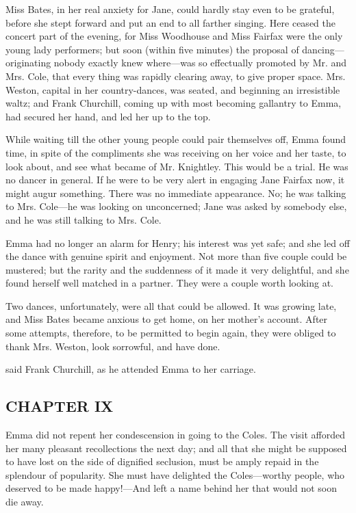 Miss Bates, in her real anxiety for Jane, could hardly stay even to be grateful, before she stept forward and put an end to all farther singing. Here ceased the concert part of the evening, for Miss Woodhouse and Miss Fairfax were the only young lady performers; but soon (within five minutes) the proposal of dancing---originating nobody exactly knew where---was so effectually promoted by Mr. and Mrs. Cole, that every thing was rapidly clearing away, to give proper space. Mrs. Weston, capital in her country-dances, was seated, and beginning an irresistible waltz; and Frank Churchill, coming up with most becoming gallantry to Emma, had secured her hand, and led her up to the top.

While waiting till the other young people could pair themselves off, Emma found time, in spite of the compliments she was receiving on her voice and her taste, to look about, and see what became of Mr. Knightley. This would be a trial. He was no dancer in general. If he were to be very alert in engaging Jane Fairfax now, it might augur something. There was no immediate appearance. No; he was talking to Mrs. Cole---he was looking on unconcerned; Jane was asked by somebody else, and he was still talking to Mrs. Cole.

Emma had no longer an alarm for Henry; his interest was yet safe; and she led off the dance with genuine spirit and enjoyment. Not more than five couple could be mustered; but the rarity and the suddenness of it made it very delightful, and she found herself well matched in a partner. They were a couple worth looking at.

Two dances, unfortunately, were all that could be allowed. It was growing late, and Miss Bates became anxious to get home, on her mother's account. After some attempts, therefore, to be permitted to begin again, they were obliged to thank Mrs. Weston, look sorrowful, and have done.

 said Frank Churchill, as he attended Emma to her carriage. 

\subsection[chapter-ix-1]{\useURL[url28][][][]\from[url28]CHAPTER IX}

Emma did not repent her condescension in going to the Coles. The visit afforded her many pleasant recollections the next day; and all that she might be supposed to have lost on the side of dignified seclusion, must be amply repaid in the splendour of popularity. She must have delighted the Coles---worthy people, who deserved to be made happy!---And left a name behind her that would not soon die away.

